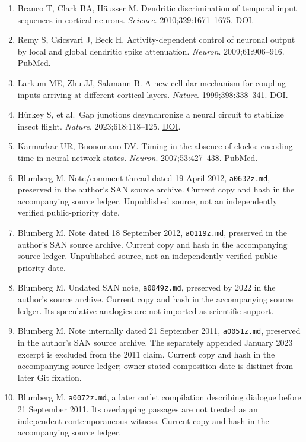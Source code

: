 \documentclass[
  american,
  11pt,
  letterpaper,
]{article}
\begin{document}
\begin{enumerate}
\def\labelenumi{\arabic{enumi}.}
\item
  Branco T, Clark BA, Häusser M. Dendritic discrimination of temporal input sequences in cortical neurons. \emph{Science}. 2010;329:1671--1675. \href{https://doi.org/10.1126/science.1189664}{DOI}.
\item
  Remy S, Csicsvari J, Beck H. Activity-dependent control of neuronal output by local and global dendritic spike attenuation. \emph{Neuron}. 2009;61:906--916. \href{https://pubmed.ncbi.nlm.nih.gov/19323999/}{PubMed}.
\item
  Larkum ME, Zhu JJ, Sakmann B. A new cellular mechanism for coupling inputs arriving at different cortical layers. \emph{Nature}. 1999;398:338--341. \href{https://doi.org/10.1038/18686}{DOI}.
\item
  Hürkey S, et al.~Gap junctions desynchronize a neural circuit to stabilize insect flight. \emph{Nature}. 2023;618:118--125. \href{https://doi.org/10.1038/s41586-023-06099-0}{DOI}.
\item
  Karmarkar UR, Buonomano DV. Timing in the absence of clocks: encoding time in neural network states. \emph{Neuron}. 2007;53:427--438. \href{https://pubmed.ncbi.nlm.nih.gov/17270738/}{PubMed}.
\item
  Blumberg M. Note/comment thread dated 19 April 2012, \texttt{a0632z.md}, preserved in the author's SAN source archive. Current copy and hash in the accompanying source ledger. Unpublished source, not an independently verified public-priority date.
\item
  Blumberg M. Note dated 18 September 2012, \texttt{a0119z.md}, preserved in the author's SAN source archive. Current copy and hash in the accompanying source ledger. Unpublished source, not an independently verified public-priority date.
\item
  Blumberg M. Undated SAN note, \texttt{a0049z.md}, preserved by 2022 in the author's source archive. Current copy and hash in the accompanying source ledger. Its speculative analogies are not imported as scientific support.
\item
  Blumberg M. Note internally dated 21 September 2011, \texttt{a0051z.md}, preserved in the author's SAN source archive. The separately appended January 2023 excerpt is excluded from the 2011 claim. Current copy and hash in the accompanying source ledger; owner-stated composition date is distinct from later Git fixation.
\item
  Blumberg M. \texttt{a0072z.md}, a later cutlet compilation describing dialogue before 21 September 2011. Its overlapping passages are not treated as an independent contemporaneous witness. Current copy and hash in the accompanying source ledger.

\end{enumerate}
\end{document}
